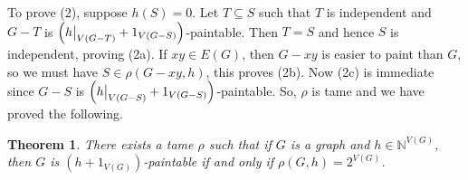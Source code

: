 \documentclass[12pt]{article}
\theoremstyle{plain}
\newtheorem{thm}{Theorem}[section]
\theoremstyle{definition}
\theoremstyle{remark}
\newcommand{\IN}{\mathbb{N}}
\newcommand{\parens}[1]{\left( #1 \right)}
\newcommand\restr[2]{{%
  \left.\kern-\nulldelimiterspace %
  #1 %
  \vphantom{\big|} %
  \right|_{#2} %
  }}
\begin{document}
To prove (2), suppose $h(S) = 0$.  Let $T \subseteq S$ such that $T$ is independent and $G-T$ is $\parens{\restr{h}{V(G-T)} + 1_{V(G-S)}}$-paintable.  Then $T=S$ and hence $S$ is independent, proving (2a).  If $xy \in E(G)$, then $G-xy$ is easier to paint than $G$, so we must have $S \in \rho(G-xy, h)$, this proves (2b).  Now (2c) is immediate since $G-S$ is $\parens{\restr{h}{V(G-S)} + 1_{V(G-S)}}$-paintable.  So, $\rho$ is tame and we have proved the following.

\begin{thm}
	There exists a tame $\rho$ such that if $G$ is a graph and $h \in \IN^{V(G)}$, then $G$ is $(h + 1_{V(G)})$-paintable if and only if $\rho(G, h) = 2^{V(G)}$.
\end{thm}



\end{document}

